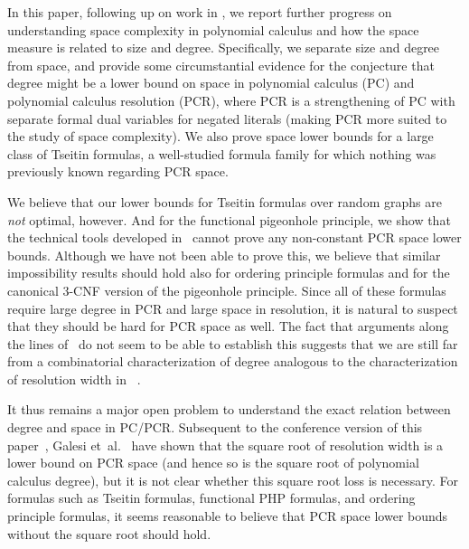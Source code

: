 \documentclass[11pt]{article}
\numberwithin{equation}{section}
\theoremstyle{definition}
\theoremstyle{plain}
\providecommand{\etal}{et~al.}
\begin{document}
In this paper, following up on 
%
work in
\cite{BNT13SomeTradeoffs,BG15Framework,FLNRT15SpaceCplx,HN12VirtueSuccinctProofs},
we report further progress on understanding space complexity in
polynomial calculus and how the space measure is related to size and degree.
Specifically, we separate size and degree from
space, and provide some circumstantial evidence for the conjecture
that degree might be a lower bound on space in 
%
polynomial calculus (PC) and polynomial calculus resolution (PCR),
where PCR is a strengthening of PC with separate formal dual variables
for negated literals (making PCR more suited to the
study of space complexity).
We also prove space lower bounds for a large class of Tseitin
formulas, a well-studied formula family for which nothing was
previously known regarding PCR space.

We 
%
believe that our lower bounds for Tseitin formulas
over random graphs are \emph{not} optimal, however. And for the
functional pigeonhole principle, we show that the technical tools
developed in~%
\cite{BG15Framework}
cannot prove any non-constant PCR space lower bounds. Although we have
not been able to prove this, we believe that similar impossibility
results should hold also for ordering principle formulas and for the
canonical \mbox{$3$-CNF} version of the pigeonhole principle.
Since all of these formulas require large degree in PCR
and large space in resolution, it is natural to suspect that
they should be hard for PCR space as well.
The fact that arguments along the lines of~%
\cite{BG15Framework}
do not seem to be able to establish this suggests that we are still
far from a combinatorial characterization of degree analogous to
the characterization of resolution width 
in~%
\cite{AD08CombinatoricalCharacterization}.

It thus remains a major open problem to understand the exact
relation between degree and space in PC/PCR.
Subsequent to the conference version of this
paper~\cite{conf-version}, %
Galesi \etal~\cite{GKT19SpaceWidth} have shown that
%
%
%
the square root of resolution width %
is a lower bound on PCR space %
(and hence so is the square root of polynomial calculus degree), %
but it is not clear whether this square root loss is necessary.
For formulas such as Tseitin formulas, functional PHP formulas, and
ordering principle formulas, it seems reasonable to believe that PCR space
lower bounds without the square root should hold.
\end{document}
